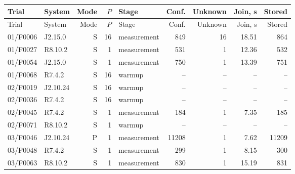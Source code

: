 \begin{longtable}{llrrlrrrr}
\toprule
Trial & System & Mode & $P$ & Stage & Conf. & Unknown & Join, s & Stored\\
\midrule
\endfirsthead
\toprule
Trial & System & Mode & $P$ & Stage & Conf. & Unknown & Join, s & Stored\\
\midrule
\endhead
01/F0006 & J2.15.0 & S & 16 & measurement & 849 & 16 & 18.51 & 864\\
01/F0027 & R8.10.2 & S & 1 & measurement & 531 & 1 & 12.36 & 532\\
01/F0054 & J2.15.0 & S & 1 & measurement & 750 & 1 & 13.39 & 751\\
01/F0068 & R7.4.2 & S & 16 & warmup & -- & -- & -- & --\\
02/F0019 & J2.10.24 & S & 16 & warmup & -- & -- & -- & --\\
02/F0036 & R7.4.2 & S & 16 & warmup & -- & -- & -- & --\\
02/F0045 & R7.4.2 & S & 1 & measurement & 184 & 1 & 7.35 & 185\\
02/F0071 & R8.10.2 & S & 1 & warmup & -- & -- & -- & --\\
03/F0046 & J2.10.24 & P & 1 & measurement & 11208 & 1 & 7.62 & 11209\\
03/F0048 & R7.4.2 & S & 1 & measurement & 299 & 1 & 8.15 & 300\\
03/F0063 & R8.10.2 & S & 1 & measurement & 830 & 1 & 15.19 & 831\\
\bottomrule
\end{longtable}
